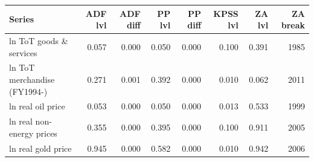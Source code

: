 \begin{tabular}{lrrrrrrr}
\toprule
Series & ADF lvl & ADF diff & PP lvl & PP diff & KPSS lvl & ZA lvl & ZA break \\
\midrule
ln ToT goods \& services & 0.057 & 0.000 & 0.050 & 0.000 & 0.100 & 0.391 & 1985 \\
ln ToT merchandise (FY1994-) & 0.271 & 0.001 & 0.392 & 0.000 & 0.010 & 0.062 & 2011 \\
ln real oil price & 0.053 & 0.000 & 0.050 & 0.000 & 0.013 & 0.533 & 1999 \\
ln real non-energy prices & 0.355 & 0.000 & 0.395 & 0.000 & 0.100 & 0.911 & 2005 \\
ln real gold price & 0.945 & 0.000 & 0.582 & 0.000 & 0.010 & 0.942 & 2006 \\
\bottomrule
\end{tabular}
